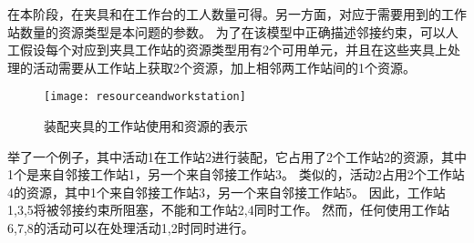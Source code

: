 在本阶段，在夹具和在工作台的工人数量可得。另一方面，对应于需要用到的工作站数量的资源类型是本问题的参数。
为了在该模型中正确描述邻接约束，可以人工假设每个对应到夹具工作站的资源类型用有2个可用单元，并且在这些夹具上处理的活动需要从工作站上获取2个资源，加上相邻两工作站间的1个资源。
\begin{figure}[h]
\centering\caption{装配夹具的工作站使用和资源的表示\label{fig:representationofresourcesandworkstations}}
\texttt{[image: resourceandworkstation]}
\end{figure}
举了一个例子，其中活动1在工作站2进行装配，它占用了2个工作站2的资源，其中1个是来自邻接工作站1，另一个来自邻接工作站3。
类似的，活动2占用2个工作站4的资源，其中1个来自邻接工作站3，另一个来自邻接工作站5。
因此，工作站1,3,5将被邻接约束所阻塞，不能和工作站2,4同时工作。
然而，任何使用工作站6,7,8的活动可以在处理活动1,2时同时进行。